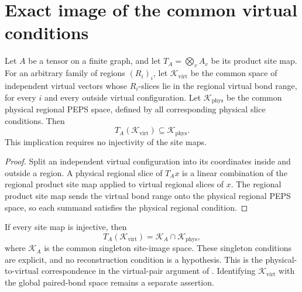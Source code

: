 \section{Exact image of the common virtual conditions}%
\label{sec:peps_vertex_virtual_parent_transport}

\begin{lemma}%
    \label{thm:peps_vertex_virtual_parent_forward}
    \leanok
    Let $A$ be a tensor on a finite graph, and let
    $T_A=\bigotimes_vA_v$ be its product site map.
    For an arbitrary family of regions $(R_i)_i$, let
    $\mathcal K_{\mathrm{virt}}$ be the common space of independent
    virtual vectors whose $R_i$-slices lie in the regional
    virtual bond range, for every $i$ and every outside virtual
    configuration. Let $\mathcal K_{\mathrm{phys}}$ be the common
    physical regional PEPS space, defined by all corresponding
    physical slice conditions. Then
    \[
        T_A(\mathcal K_{\mathrm{virt}})
        \subseteq\mathcal K_{\mathrm{phys}}.
    \]
    This implication requires no injectivity of the site maps.
\end{lemma}

\begin{proof}\leanok
    Split an independent virtual configuration into its coordinates
    inside and outside a region. A physical regional slice of
    $T_Ax$ is a linear combination of the regional product site map
    applied to virtual regional slices of $x$.
    The regional product site map sends the virtual bond
    range onto the physical regional PEPS space, so each
    summand satisfies the physical regional condition.
\end{proof}

\begin{lemma}%
    \label{thm:peps_vertex_virtual_parent_transport}
    \leanok
    If every site map is injective, then
    \[
        T_A(\mathcal K_{\mathrm{virt}})
        =\mathcal K_A\cap\mathcal K_{\mathrm{phys}},
    \]
    where $\mathcal K_A$ is the common singleton site-image space.
    These singleton conditions are explicit, and no reconstruction
    condition is a hypothesis.
    This is the physical-to-virtual correspondence in the
    virtual-pair argument of
    \cite[Section~IV.C.1]{Cirac2021Matrix}.
    Identifying $\mathcal K_{\mathrm{virt}}$ with the global paired-bond
    space remains a separate assertion.
\end{lemma}


